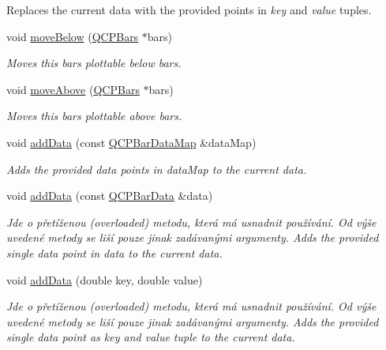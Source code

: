 \begin{DoxyCompactItemize}
\begin{DoxyCompactList}
Replaces the current data with the provided points in {\itshape key} and {\itshape value} tuples. \end{DoxyCompactList}\item 
void \hyperlink{classQCPBars_a69fc371346980f19177c3d1ecdad78ee}{move\+Below} (\hyperlink{classQCPBars}{Q\+C\+P\+Bars} $\ast$bars)
\begin{DoxyCompactList}\small\item\em Moves this bars plottable below {\itshape bars}. \end{DoxyCompactList}\item 
void \hyperlink{classQCPBars_ac22e00a6a41509538c21b04f0a57318c}{move\+Above} (\hyperlink{classQCPBars}{Q\+C\+P\+Bars} $\ast$bars)
\begin{DoxyCompactList}\small\item\em Moves this bars plottable above {\itshape bars}. \end{DoxyCompactList}\item 
void \hyperlink{classQCPBars_a1f29cf08615040993209147fa68de3f2}{add\+Data} (const \hyperlink{qcustomplot_8h_aa846c77472cae93def9f1609d0c57191}{Q\+C\+P\+Bar\+Data\+Map} \&data\+Map)
\begin{DoxyCompactList}\small\item\em Adds the provided data points in {\itshape data\+Map} to the current data. \end{DoxyCompactList}\item 
void \hyperlink{classQCPBars_a142158b1addefd53259002dd3ab22c3a}{add\+Data} (const \hyperlink{classQCPBarData}{Q\+C\+P\+Bar\+Data} \&data)
\begin{DoxyCompactList}\small\item\em Jde o přetíženou (overloaded) metodu, která má usnadnit používání. Od výše uvedené metody se liší pouze jinak zadávanými argumenty. Adds the provided single data point in {\itshape data} to the current data. \end{DoxyCompactList}\item 
void \hyperlink{classQCPBars_a684dd105403a5497fda42f2094fecbb7}{add\+Data} (double key, double value)
\begin{DoxyCompactList}\small\item\em Jde o přetíženou (overloaded) metodu, která má usnadnit používání. Od výše uvedené metody se liší pouze jinak zadávanými argumenty. Adds the provided single data point as {\itshape key} and {\itshape value} tuple to the current data. \end{DoxyCompactList}\item 

\end{DoxyCompactItemize}
